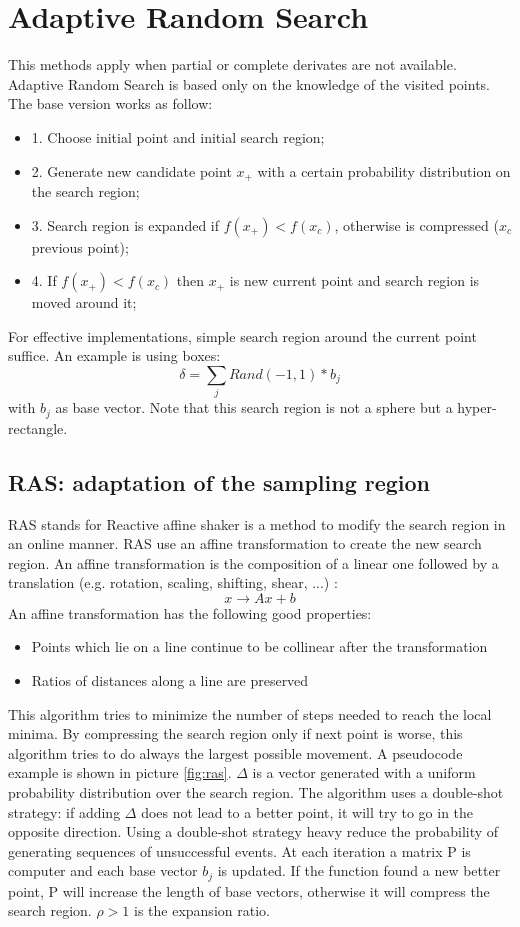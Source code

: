 \documentclass[11pt]{article}
\begin{document}
\section{Adaptive Random Search}
This methods apply when partial or complete derivates are not available. Adaptive Random Search is based only on the knowledge of the visited points. The base version works as follow:
\begin{itemize}
\item{1. Choose initial point and initial search region;}
\item{2. Generate new candidate point $x_+$ with a certain probability distribution on the search region;}
\item{3. Search region is expanded if $f(x_+) < f(x_c)$, otherwise is compressed ($x_c$ previous point);}
\item{4. If $f(x_+) < f(x_c)$ then $x_+$ is new current point and search region is moved around it;}
\end{itemize}
For effective implementations, simple search region around the current point suffice. An example is using boxes: 
$$
\delta = \sum_{j} Rand(-1,1) * b_j
$$
 with $b_j$ as base vector. Note that this search region is not a sphere but a hyper-rectangle.

\subsection{RAS: adaptation of the sampling region}
RAS stands for Reactive affine shaker is a method to modify the search region in an online manner. RAS use an affine transformation to 
create the new search region. An affine transformation is the composition of a linear one followed by a translation (e.g. rotation, scaling, shifting, shear, ...) :
$$
x \rightarrow Ax + b
$$
An affine transformation has the following good properties:
\begin{itemize}
\item{Points which lie on a line continue to be collinear after the transformation}
\item{Ratios of distances along a line are preserved}
\end{itemize}

This algorithm tries to minimize the number of steps needed to reach the local minima. By compressing the search region only if next point is worse, this algorithm tries to do always the largest possible movement. A pseudocode example is shown in picture \ref{fig:ras}. $\Delta$ is a vector generated with a uniform probability distribution over the search region. The algorithm uses a double-shot strategy: if adding $\Delta$ does not lead to a better point, it will try to go in the opposite direction. Using a double-shot strategy heavy reduce the probability of generating sequences of unsuccessful events. At each iteration a matrix P is computer and each base vector $b_j$ is updated.
If the function found a new better point, P will increase the length of base vectors, otherwise it will compress the search region. $\rho > 1$ is the expansion ratio. 
\end{document}
